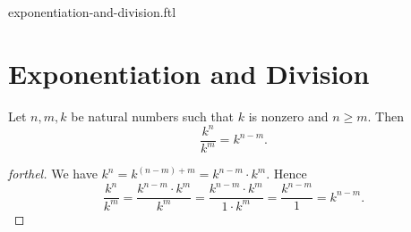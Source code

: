\documentclass{naproche-library}
\begin{document}
\begin{smodule}{exponentiation-and-division.ftl}

  \section*{Exponentiation and Division}

  \begin{proposition}[forthel,id=ARITHMETIC_14_2345102698451257,printid]
    Let $n, m, k$ be natural numbers such that $k$ is nonzero and $n \geq m$.
    Then \[\frac{k^{n}}{k^{m}} = k^{n - m}.\]
  \end{proposition}
  \begin{proof}[forthel]
    We have $k^{n} = k^{(n - m) + m} = k^{n - m} \cdot k^{m}$.
    Hence
    \[  \frac{k^{n}}{k^{m}}
        = \frac{k^{n - m} \cdot k^{m}}{k^{m}}
        = \frac{k^{n - m} \cdot k^{m}}{1 \cdot k^{m}}
        = \frac{k^{n - m}}{1}
        = k^{n - m}. \]
  \end{proof}
\end{smodule}
\end{document}
